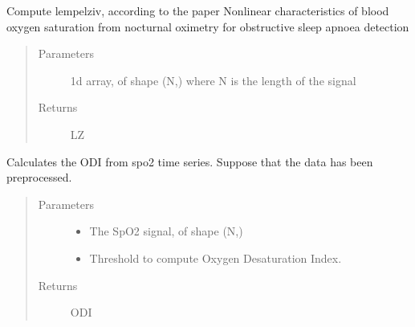 \documentclass[letterpaper,10pt,english]{sphinxmanual}
\begin{document}

\begin{fulllineitems}
\label{\detokenize{pobm.spo2:pobm.spo2.single_biomarkers.lempel_ziv}}
Compute lempel\sphinxhyphen{}ziv, according to the paper
Non\sphinxhyphen{}linear characteristics of blood oxygen saturation from nocturnal oximetry
for obstructive sleep apnoea detection
\begin{quote}\begin{description}
\item[{Parameters}] \leavevmode
{} \textendash{} 1\sphinxhyphen{}d array, of shape (N,) where N is the length of the signal

\item[{Returns}] \leavevmode
LZ

\end{description}\end{quote}

\end{fulllineitems}


\begin{fulllineitems}
\label{\detokenize{pobm.spo2:pobm.spo2.single_biomarkers.odi}}
Calculates the ODI from spo2 time series.
Suppose that the data has been preprocessed.
\begin{quote}\begin{description}
\item[{Parameters}] \leavevmode\begin{itemize}
\item {} 
 \textendash{} The SpO2 signal, of shape (N,)

\item {} 
 \textendash{} Threshold to compute Oxygen Desaturation Index.

\end{itemize}

\item[{Returns}] \leavevmode
ODI

\end{description}\end{quote}

\end{fulllineitems}
\end{document}
